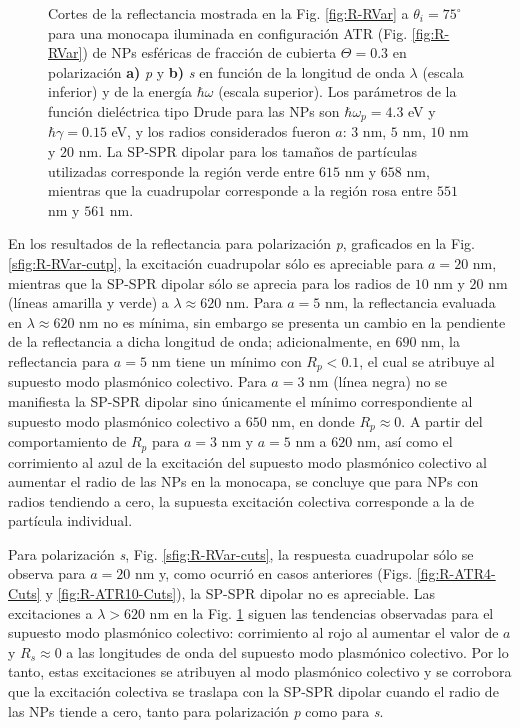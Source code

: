 \begin{figure}[h!]
	\caption{Cortes de la reflectancia mostrada en la Fig. \ref{fig:R-RVar} a $\theta_i = 75^\circ$ para una monocapa iluminada en configuración ATR (Fig. \ref{fig:R-RVar}) de NPs esféricas de fracción de cubierta $\Theta = 0.3$ en polarización \textbf{a)} \emph{p} y \textbf{b)} \emph{s} en función de la longitud de onda $\lambda$ (escala inferior) y de la energía $\hbar\omega$ (escala superior). Los parámetros de la función dieléctrica tipo Drude para las NPs son $\hbar\omega_p = 4.3$ eV y $\hbar\gamma = 0.15$ eV, y los radios  considerados fueron $a$: $3$ nm, $5$ nm, $10$ nm y $20$ nm. La SP-SPR dipolar para los tamaños de partículas utilizadas corresponde la región verde entre $615$ nm y $658$ nm, mientras que la cuadrupolar corresponde a la región rosa entre $551$ nm y $561$ nm.}\label{fig:R-RVar-Cuts}
	\end{figure}	

En los resultados de la reflectancia para polarización \emph{p}, graficados en la Fig. \ref{sfig:R-RVar-cutp}, la excitación cuadrupolar sólo es apreciable para $a=20$ nm, mientras que la SP-SPR dipolar sólo se aprecia para los radios de $10$ nm y $20$ nm (líneas amarilla y verde) a $\lambda\approx 620$ nm. Para $a=5$ nm, la reflectancia evaluada en $\lambda\approx 620$ nm no es mínima, sin embargo se presenta un cambio en la pendiente de la reflectancia a dicha longitud de onda; adicionalmente, en $690$ nm, la reflectancia para $a=5$ nm tiene un mínimo con $R_p<0.1$, el cual se atribuye al supuesto modo plasmónico colectivo. Para $a=3$ nm (línea negra) no se manifiesta la SP-SPR dipolar sino únicamente el mínimo correspondiente al supuesto modo plasmónico colectivo a $650$ nm, en donde $R_p\approx 0$. A partir del comportamiento de $R_p$ para $a=3$ nm y $a=5$ nm a $620$ nm, así como el corrimiento al azul de la excitación del supuesto modo plasmónico colectivo al aumentar el radio de las NPs en la monocapa, se concluye que para NPs con radios tendiendo a cero, la supuesta excitación colectiva corresponde a la de partícula individual.
 
 Para polarización \emph{s}, Fig. \ref{sfig:R-RVar-cuts}, la respuesta cuadrupolar sólo se observa para $a = 20$ nm y, como ocurrió en casos anteriores (Figs. \ref{fig:R-ATR4-Cuts} y \ref{fig:R-ATR10-Cuts}), la SP-SPR dipolar no es apreciable. Las excitaciones a $\lambda>620$ nm en la Fig. \ref{fig:R-RVar-Cuts} siguen las tendencias observadas para el supuesto modo plasmónico colectivo: corrimiento al rojo al aumentar el valor de $a$ y $R_s\approx 0$ a las longitudes de onda del supuesto modo plasmónico colectivo. Por lo tanto, estas excitaciones se atribuyen al modo plasmónico colectivo y se corrobora que la excitación colectiva se traslapa con la SP-SPR dipolar cuando el radio de las NPs tiende a cero, tanto para polarización \emph{p} como para \emph{s}.
 
